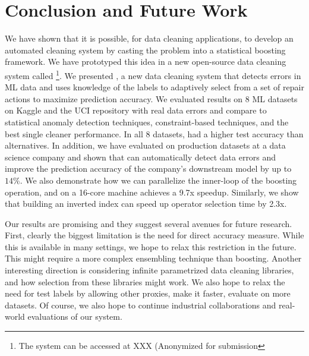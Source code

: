 \section{Conclusion and Future Work}
We have shown that it is possible, for data cleaning applications, to develop an automated cleaning system by casting the problem into a statistical boosting framework.  We have prototyped this idea in a new open-source data cleaning system called \sys\footnote{The system can be accessed at XXX (Anonymized for submission}.
We presented \sys, a new data cleaning system that detects errors in ML data and uses knowledge of the labels to adaptively select from a set of repair actions to maximize prediction accuracy.
We evaluated results on 8 ML datasets on Kaggle and the UCI repository with real data errors and compare to statistical anomaly detection techniques, constraint-based techniques, and the best single cleaner performance. In all 8 datasets, \sys had a higher test accuracy than alternatives. In addition, we have evaluated \sys on production datasets at a data science company and shown that \sys can automatically detect data errors and improve the prediction accuracy of the company's downstream model by up to $14\%$.  We also demonstrate how we can parallelize the inner-loop of the boosting operation, and on a 16-core machine \sys achieves a 9.7x speedup. Similarly, we show that building an inverted index can speed up operator selection time by 2.3x.

Our results are promising and they suggest several avenues for future research.
First, clearly the biggest limitation is the need for direct accuracy measure.
While this is available in many settings, we hope to relax this restriction in the future.
This might require a more complex ensembling technique than boosting.
Another interesting direction is considering infinite parametrized data cleaning libraries, and how selection from these libraries might work.
We also hope to relax the need for test labels by allowing other proxies, make it faster, evaluate on more datasets.
Of course, we also hope to continue industrial collaborations and real-world evaluations of our system.
